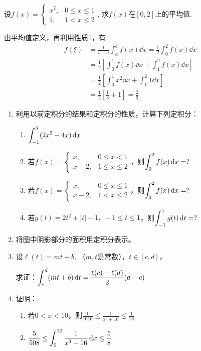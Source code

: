 \begin{example}
  设$f(x)=\begin{cases}
      x^2,& 0\le x\le 1\\
      1,& 1<x\le 2
  \end{cases}$,  求$f(x)$在$[0,2]$上的平均值.
\end{example}

\begin{solution}
由平均值定义，再利用性质1，有    
\[\begin{split}
    f(\xi)&=\frac{1}{b-a}\int^b_a f(x)\dd x=\frac{1}{2}\int^2_0 f(x)\dd x\\
    &=\frac{1}{2}\left[\int^1_0 f(x)\dd x+\int^2_1 f(x)\dd x\right]\\
    &=\frac{1}{2}\left[\int^1_0 x^2\dd x+\int^2_1 1\dd x\right]\\
    &=\frac{1}{2}\left[\frac{1}{3}+1\right]=\frac{2}{3}
\end{split}\]
\end{solution}

\begin{ex}
\begin{enumerate}
    \item 利用以前定积分的结果和定积分的性质，计算下列定积分：
\begin{enumerate}
    \item $\displaystyle\int^3_{-1}(2x^2-4x)\,{\rm d} x$
    \item 若$f(x)=\begin{cases}
        x,& 0\le x<1\\
        x-2,& 1\le x\le 2
    \end{cases}$，则$\displaystyle\int^2_0 f(x)\,{\rm d} x=?$
    \item 若$f(x)=\begin{cases}
        x,& 0\le x\le 1\\
        x-2,& 1< x\le 2
    \end{cases}$，则$\displaystyle\int^2_0 f(x)\,{\rm d} x=?$
\item 若$g(t)=2t^2+|t|-1,\; -1\le t\le 1$，则$\displaystyle\int^1_{-1} g(t)\,{\rm d} t=?$
\end{enumerate}

\item 将图中阴影部分的面积用定积分表示。
\item 设$\ell(t)=mt+b$, （$m,t$是常数），$t\in [c,d]$，

求证：$\displaystyle\int^d_c (mt+b)\,{\rm d} t=\dfrac{\ell(c)+\ell(d)}{2}(d-c)$
\item 证明：
\begin{enumerate}
    \item 若$0<x<10$，则$\frac{1}{1016}\le\frac{1}{x^3+16}\le \frac{1}{16}$
    \item $\dfrac{5}{508}\le \displaystyle\int^{10}_0\dfrac{1}{x^3+16}\,{\rm d} x\le \dfrac{5}{8}$
\end{enumerate}
\end{enumerate}
\end{ex}

